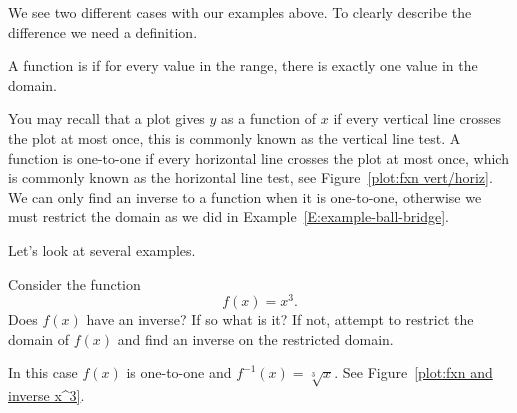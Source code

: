\documentclass{ximera}
\begin{document}
We see two different cases with our examples above. To clearly
describe the difference we need a definition.

\begin{definition} 
A function is  if for every value in the range,
there is exactly one value in the domain.
\end{definition}

You may recall that a plot gives $y$ as a function of $x$ if every
vertical line crosses the plot at most once, this is commonly known as
the vertical line test. A function is one-to-one if every horizontal
line crosses the plot at most once, which is commonly known as the
horizontal line test, see Figure~\ref{plot:fxn vert/horiz}.  We can
only find an inverse to a function when it is one-to-one, otherwise we
must restrict the domain as we did in
Example~\ref{E:example-ball-bridge}.


Let's look at several examples.



\begin{example}
Consider the function
\[
f(x) = x^3.
\]
Does $f(x)$ have an inverse? If so what is it? If not, attempt to
restrict the domain of $f(x)$ and find an inverse on the restricted
domain.
\end{example}


\begin{solution}
In this case $f(x)$ is one-to-one and $f^{-1}(x) = \sqrt[3]{x}$. See Figure~\ref{plot:fxn and inverse x^3}.
\end{solution}


\begin{image}
\end{image}
\end{document}

